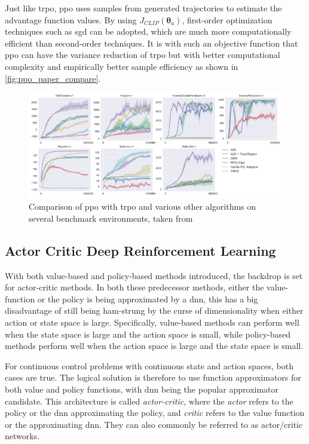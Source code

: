 \documentclass[../report.tex]{subfiles}
\begin{document}
Just like \ac{trpo}, \ac{ppo} uses samples from generated trajectories to estimate the advantage function values. By using $J_{CLIP}(\boldsymbol{\theta}_a)$, first-order optimization techniques such as \ac{sgd} can be adopted, which are much more computationally efficient than second-order techniques. It is with such an objective function that \ac{ppo} can have the variance reduction of \ac{trpo} but with better computational complexity and empirically better sample efficiency as shown in \autoref{fig:ppo_paper_compare}.

\begin{figure}[h]
    \centering
    \includegraphics[width=\textwidth]{figures/01/ppo_paper_comparisons.png}
    \caption{Comparison of \ac{ppo} with \ac{trpo} and various other algorithms on several benchmark environments, taken from \cite{ppo}}
    \label{fig:ppo_paper_compare}
\end{figure}


\subsection{Actor Critic Deep Reinforcement Learning}\label{subsec:ac_drl}

With both value-based and policy-based methods introduced, the backdrop is set for actor-critic methods. In both these predecessor methods, either the value-function or the policy is being approximated by a \ac{dnn}, this has a big disadvantage of still being ham-strung by the curse of dimensionality when either action or state space is large. Specifically, value-based methods can perform well when the state space is large and the action space is small, while policy-based methods perform well when the action space is large and the state space is small.


For continuous control problems with continuous state and action spaces, both cases are true. The logical solution is therefore to use function approximators for both value and policy functions, with \ac{dnn} being the popular approximator candidate. This architecture is called \textit{actor-critic}, where the \textit{actor} refers to the policy or the \ac{dnn} approximating the policy, and \textit{critic} refers to the value function or the approximating \ac{dnn}. They can also commonly be referred to as actor/critic networks.
\end{document}
